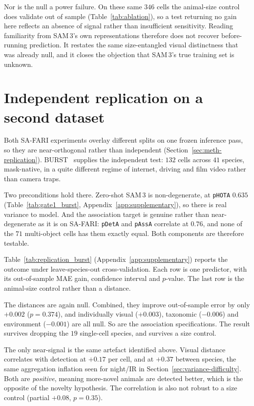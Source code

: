 Nor is the null a power failure. On these same $346$ cells the animal-size control does validate out of
sample (Table~\ref{tab:ablation}), so a test returning no gain here reflects an absence of signal rather than
insufficient sensitivity. Reading familiarity from SAM\,3's own representations therefore does not recover
before-running prediction. It restates the same size-entangled visual distinctness that was already null, and
it closes the objection that SAM\,3's true training set is unknown.

\section{Independent replication on a second dataset}
\label{sec:burst}
Both SA-FARI experiments overlay different splits on one frozen inference pass, so they are near-orthogonal
rather than independent (Section~\ref{sec:meth-replication}). BURST~\cite{burst} supplies the independent test:
$132$ cells across $41$ species, mask-native, in a quite different regime of internet, driving and film video
rather than camera traps.

Two preconditions hold there. Zero-shot SAM\,3 is non-degenerate, at \texttt{pHOTA} $0.635$
(Table~\ref{tab:gate1_burst}, Appendix~\ref{app:supplementary}), so there is real variance to model. And the
association target is genuine rather than near-degenerate as it is on SA-FARI: \texttt{pDetA} and
\texttt{pAssA} correlate at $0.76$, and none of the $71$ multi-object cells has them exactly equal. Both components are therefore testable.

Table~\ref{tab:replication_burst} (Appendix~\ref{app:supplementary}) reports the outcome under
leave-species-out cross-validation. Each row is one
predictor, with its out-of-sample MAE gain, confidence interval and $p$-value. The last row is the animal-size
control rather than a distance.

The distances are again null. Combined, they improve out-of-sample error by only $+0.002$ ($p=0.374$), and
individually visual ($+0.003$), taxonomic ($-0.006$) and environment ($-0.001$) are all null. So are the
association specifications. The result survives dropping the $19$ single-cell species, and survives a size
control.

The only near-signal is the same artefact identified above. Visual distance correlates with detection at
$+0.17$ per cell, and at $+0.37$ between species, the same aggregation inflation seen for night/IR in
Section~\ref{sec:variance-difficulty}. Both are \emph{positive}, meaning more-novel animals are detected
better, which is the opposite of the novelty hypothesis. The correlation is also not robust to a size control
(partial $+0.08$, $p=0.35$).

